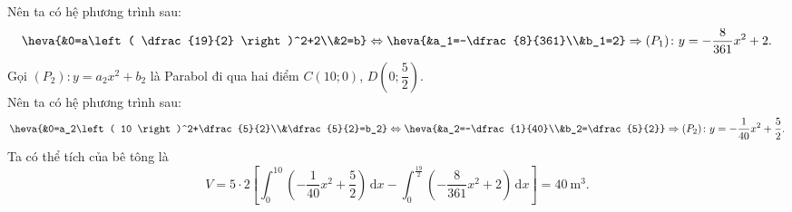 \begin{ex}
{		Nên ta có hệ phương trình sau: 
		$$\heva{&0=a\left( \dfrac{19}{2} \right)^2+2\\&2=b}
		\Leftrightarrow \heva{&a_1=-\dfrac{8}{361}\\&b_1=2}
		\Rightarrow (P_1)\colon y=-\dfrac{8}{361}{x^2}+2.$$
		Gọi $(P_2)\colon y=a_2x^2+b_2$ là Parabol đi qua hai điểm $C\left( 10;0 \right)$, $D\left( 0;\dfrac{5}{2} \right)$.\\
		Nên ta có hệ phương trình sau: 
		$$\heva{&0=a_2\left( 10 \right)^2+\dfrac{5}{2}\\&\dfrac{5}{2}=b_2}
		\Leftrightarrow \heva{&a_2=-\dfrac{1}{40}\\&b_2=\dfrac{5}{2}}
		\Rightarrow (P_2)\colon y=-\dfrac{1}{40} x^2+\dfrac{5}{2}.$$
		Ta có thể tích của bê tông là 
		$$ V=5\cdot 2\left[ \int_0^{10} \left( -\dfrac{1}{40}{x^2}+\dfrac{5}{2} \right)\mathrm{\,d}x- \int_0^{\tfrac{19}{2}} \left( -\dfrac{8}{361}{x^2}+2 \right)\mathrm{\,d}x \right]
		=40~\text{m}^3.$$
	}
\end{ex}

